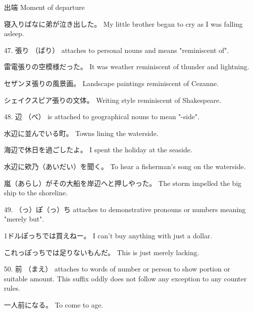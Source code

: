\par{出端 \hfill\break
Moment of departure }

\par{寝入りばなに弟が泣き出した。 \hfill\break
My little brother began to cry as I was falling asleep. }

\par{47. 張り （ばり） attaches to personal nouns and means "reminiscent of". }

\par{雷電張りの空模様だった。 \hfill\break
It was weather reminiscent of thunder and lightning. }

\par{セザンヌ張りの風景画。 \hfill\break
Landscape paintings reminiscent of Cezanne. }

\par{シェイクスピア張りの文体。 \hfill\break
Writing style reminiscent of Shakespeare. }

\par{48. 辺 （べ） is attached to geographical nouns to mean "-side". }

\par{水辺に並んでいる町。 \hfill\break
Towns lining the waterside. }

\par{海辺で休日を過ごしたよ。 \hfill\break
I spent the holiday at the seaside. }

\par{水辺に欸乃（あいだい）を聞く。 \hfill\break
To hear a fisherman's song on the waterside. }

\par{嵐（あらし）がその大船を岸辺へと押しやった。 \hfill\break
The storm impelled the big ship to the shoreline. }

\par{49. （っ）ぽ（っ）ち attaches to demonstrative pronouns or numbers meaning "merely but". }

\par{1ドルぽっちでは買えねー。 \hfill\break
I can't buy anything with just a dollar. }

\par{これっぽっちでは足りないもんだ。 \hfill\break
This is just merely lacking. }

\par{50. 前 （まえ） attaches to words of number or person to show portion or suitable amount. This suffix oddly does not follow any exception to any counter rules. }

\par{一人前になる。 \hfill\break
To come to age. }

